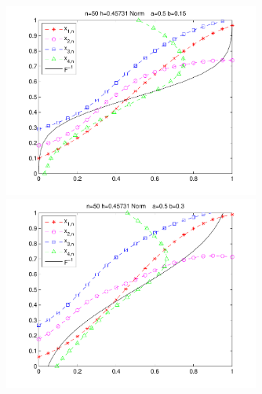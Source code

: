 \documentclass[a4paper,14pt,russian]{article}
\begin{document}
\begin{figure}[h]
\includegraphics[width = 240pt,height = 180pt]{11.pdf}
\includegraphics[width = 240pt,height = 180pt]{12.pdf}
\end{figure}

\newpage
\end{document}
